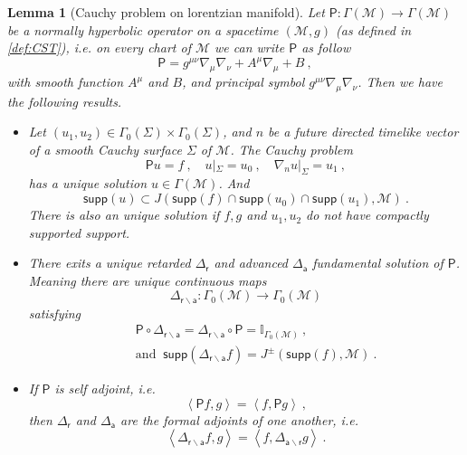\documentclass[10pt]{book}
\newcommand{\supp}{\mathsf{supp}}
\newcommand{\sm}[1]{\left\langle#1\right\rangle}
\newcommand{\Mcal}{\mathcal{M}}
\newcommand{\Ibb}{\mathbb{I}}
\newcommand{\Psf}{\mathsf{P}}
\newcommand{\asf}{\mathsf{a}}
\newcommand{\rsf}{\mathsf{r}}
\theoremstyle{break}
\newtheorem{lemma}{Lemma}
\begin{document}
\begin{lemma}[Cauchy problem on lorentzian manifold]\label{lem:cauchy-pb}
Let $\Psf : \Gamma(\Mcal) \to \Gamma(\Mcal)$ be a normally hyperbolic operator on a spacetime $(\Mcal,g)$ (as defined in \ref{def:CST}), i.e. on every chart of $\Mcal$ we can write $\Psf$ as follow
%
\begin{equation*}
\Psf = g^{\mu\nu} \nabla_\mu \nabla_\nu + A^\mu \nabla_\mu + B \ ,
\end{equation*}
%
with smooth function $A^\mu$ and $B$, and principal symbol $g^{\mu\nu} \nabla_\mu \nabla_\nu$. Then we have the following results.
%
\begin{itemize}
\item Let $(u_1,u_2) \in \Gamma_0(\Sigma) \times \Gamma_0(\Sigma)$, and $n$ be a future directed timelike vector of a smooth Cauchy surface $\Sigma$ of $\Mcal$. The Cauchy problem
%
\begin{equation*}
\Psf u = f \ , \quad u|_\Sigma = u_0 \ , \quad \nabla_n u |_\Sigma = u_1 \ ,
\end{equation*}
%
has a unique solution $u \in \Gamma(\Mcal)$. And
%
\begin{equation*}
\supp(u) \subset J\left( \supp(f) \cap \supp(u_0) \cap \supp(u_1) , \Mcal \right) \ .
\end{equation*}
%
There is also an unique solution if $f, g$ and $u_1,u_2$ do not have compactly supported support.

\item There exits a unique retarded $\Delta_\rsf$ and advanced $\Delta_\asf$ fundamental solution of $\Psf$. Meaning there are unique continuous maps 
%
\begin{equation*}
\Delta_{\rsf\backslash\asf} : \Gamma_0(\Mcal) \to \Gamma_0(\Mcal)  
\end{equation*}
%
satisfying 
%
\begin{eqnarray*}
&& \Psf \circ \Delta_{\rsf\backslash\asf} = \Delta_{\rsf\backslash\asf} \circ \Psf = \Ibb_{\Gamma_0(\Mcal)} \ , \\
&& \mbox{and } \ \supp(\Delta_{\rsf\backslash\asf} f) = J^{\pm} \left(\supp(f) , \Mcal\right) \ .
\end{eqnarray*}

\item If $\Psf$ is self adjoint, i.e. 
%
\begin{equation*}
\sm{\Psf f,g} = \sm{f,\Psf g} \ ,
\end{equation*}
%
then $\Delta_\rsf$ and $\Delta_\asf$ are the formal adjoints of one another, i.e.
%
\begin{equation*}
\sm{\Delta_{\rsf\backslash\asf} f , g} = \sm{f , \Delta_{\asf\backslash\rsf} g} \ . 
\end{equation*}


\end{itemize}
\end{lemma}
\end{document}
